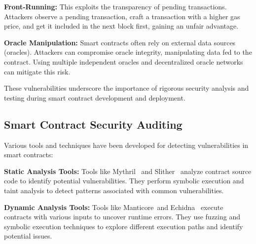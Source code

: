 
\textbf{Front-Running:} This exploits the transparency of pending transactions. Attackers observe a pending transaction, craft a transaction with a higher gas price, and get it included in the next block first, gaining an unfair advantage.



\textbf{Oracle Manipulation:} Smart contracts often rely on external data sources (oracles). Attackers can compromise oracle integrity, manipulating data fed to the contract. Using multiple independent oracles and decentralized oracle networks can mitigate this risk.

These vulnerabilities underscore the importance of rigorous security analysis and testing during smart contract development and deployment.

\subsection{Smart Contract Security Auditing}

Various tools and techniques have been developed for detecting vulnerabilities in smart contracts:

\textbf{Static Analysis Tools:} Tools like Mythril~\cite{muellerfile} and Slither~\cite{feist2019slither} analyze contract source code to identify potential vulnerabilities. They perform symbolic execution and taint analysis to detect patterns associated with common vulnerabilities.

\textbf{Dynamic Analysis Tools:} Tools like Manticore~\cite{mossberg2019manticore}and Echidna~\cite{grieco2020echidna} execute contracts with various inputs to uncover runtime errors. They use fuzzing and symbolic execution techniques to explore different execution paths and identify potential issues.

